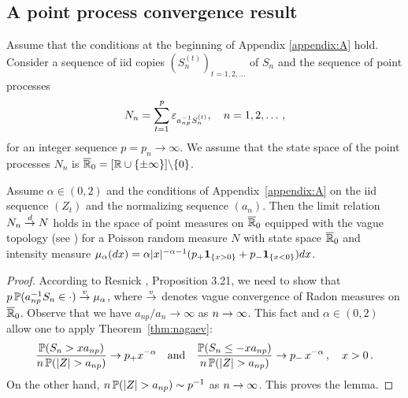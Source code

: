 \begin{subappendices}
\subsection{A point process convergence result}
Assume that the conditions at the beginning of Appendix \ref{appendix:A} hold.
Consider a sequence of iid copies $(S_{n}^{(t)})_{t=1,2,\ldots}$
of $S_n$ and the sequence of point processes
\begin{equation*}
N_n= \sum_{t=1}^{p} \varepsilon_{a_{np}^{-1} S_{n}^{(t)}}, \quad n=1,2,\ldots\,,
\end{equation*}
for an integer sequence $p=p_n\to\infty$. We assume that the state space of the
point processes $N_n$ is $\overline{\mathbb{R}}_0=[\mathbb{R}\cup\{\pm \infty\}]\backslash \{0\}$.
\begin{lemma}\label{lem:ppr}
Assume $\alpha \in (0,2)$ and the
conditions of  Appendix~\ref{appendix:A}
on the iid sequence $(Z_t)$ and the normalizing sequence $(a_n)$. Then the limit relation
$N_n\stackrel{d}{\rightarrow} N$ holds in the space of point measures on $\overline{\mathbb{R}}_0$
equipped with the vague topology (see
\cite{resnick:1987,resnick:2007})
for a  Poisson random measure $N$ with state space $\overline{\mathbb{R}}_0$ and intensity measure $\mu_\alpha(dx)=\alpha |x|^{-\alpha-1} (p_+ \mathbf{1}_{\{x>0\}}+ p_- \mathbf{1}_{\{x<0\}}) dx$.
\end{lemma}
\begin{proof}
According to Resnick \cite{resnick:1987}, Proposition 3.21, we need to
show that
$p\, \mathbb{P}(a_{np}^{-1}S_n\in \cdot)\stackrel{v}{\rightarrow} \mu_\alpha
$,
where $\stackrel{v}{\rightarrow}$ denotes vague convergence of Radon measures on  $\overline{\mathbb{R}}_0$.
Observe that we have $a_{np}/a_n\to\infty$ as $n \to \infty$. This fact and
$\alpha\in (0,2)$ allow one to apply
Theorem~\ref{thm:nagaev}:
\begin{equation*}
\dfrac{\P( S_n >x a_{np})}{n\,\P(|Z|>  a_{np})}\to p_+ x^{-\alpha}
\quad \mbox{and}\quad \dfrac{\P( S_n \le -x a_{np})}{n\,\P(|Z|>
  a_{np})}\to p_-\, x^{-\alpha}\,,\quad x>0\,.
\end{equation*}
On the other hand, $n\,\P(|Z|>  a_{np})\sim p^{-1}$ as $n \to \infty$.
This proves the lemma.
\end{proof}

\ifx\phdthesis\undefined
\else
\end{subappendices}
\fi
